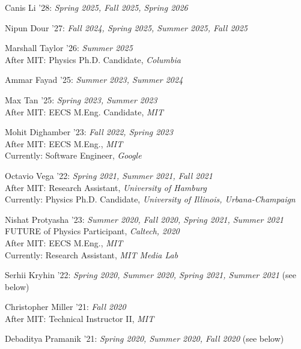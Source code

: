 \bbl

\item Canis Li '28: \emph{Spring 2025, Fall 2025, Spring 2026}

\item Nipun Dour '27: \emph{Fall 2024, Spring 2025, Summer 2025, Fall 2025}

\item Marshall Taylor '26: \emph{Summer 2025}
\\ After MIT: Physics Ph.D. Candidate, \emph{Columbia}

\item Ammar Fayad '25: \emph{Summer 2023, Summer 2024}

\item Max Tan '25: \emph{Spring 2023, Summer 2023}
\\ After MIT: EECS M.Eng. Candidate, \emph{MIT}

\item Mohit Dighamber '23: \emph{Fall 2022, Spring 2023}
\\ After MIT: EECS M.Eng., \emph{MIT}
\\ Currently: Software Engineer, \emph{Google}

\item Octavio Vega '22: \emph{Spring 2021, Summer 2021, Fall 2021}
\\ After MIT: Research Assistant, \emph{University of Hamburg}
\\ Currently: Physics Ph.D. Candidate, \emph{University of Illinois, Urbana-Champaign}

\item Nishat Protyasha '23: \emph{Summer 2020, Fall 2020, Spring 2021, Summer 2021}
\\ FUTURE of Physics Participant, \emph{Caltech, 2020}
\\ After MIT: EECS M.Eng., \emph{MIT}
\\ Currently: Research Assistant, \emph{MIT Media Lab}

\item Serhii Kryhin '22: \emph{Spring 2020, Summer 2020, Spring 2021, Summer 2021} (see below) 

\item Christopher Miller '21: \emph{Fall 2020}
\\ After MIT: Technical Instructor II, \emph{MIT}

\item Debaditya Pramanik '21: \emph{Spring 2020, Summer 2020, Fall 2020} (see below) 

